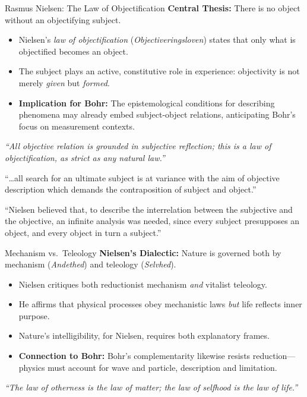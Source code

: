 \documentclass[fleqn]{beamer}
\begin{document}
\begin{frame}{Rasmus Nielsen: The Law of Objectification}
  \textbf{Central Thesis:} There is no object without an objectifying subject.

  \vspace{1em}
  \begin{itemize}
    \item Nielsen’s \emph{law of objectification} (\textit{Objectiveringsloven}) states that 
    only what is objectified becomes an object.
    \item The subject plays an active, constitutive role in experience: objectivity is not merely \emph{given} but \emph{formed}.
    \item \textbf{Implication for Bohr:} The epistemological conditions for describing phenomena 
    may already embed subject-object relations, anticipating Bohr’s focus on measurement contexts.
  \end{itemize}

  \vspace{1em}
  \textit{“All objective relation is grounded in subjective reflection; this is a law of objectification, as strict as any natural law.”}
\end{frame}

\begin{frame}{\mbox{}}

  ``\dots all search for an ultimate subject is at variance with the
  aim of objective description which demands the contraposition of
  subject and object.''  \citep[]{unity}

  \vfill ``Nielsen believed that, to describe the interrelation
  between the subjective and the objective, an infinite analysis was
  needed, since every subject presupposes an object, and every object
  in turn a subject.''  \citep[189]{hoffding1909}

  \nocite{prop60}

\end{frame}


\begin{frame}{Mechanism vs.\ Teleology}
  \textbf{Nielsen's Dialectic:} Nature is governed both by mechanism (\textit{Andethed}) and teleology (\textit{Selvhed}).

  \vspace{1em}
  \begin{itemize}
    \item Nielsen critiques both reductionist mechanism \textit{and} vitalist teleology.
    \item He affirms that physical processes obey mechanistic laws \textit{but} life reflects inner purpose.
    \item Nature’s intelligibility, for Nielsen, requires both explanatory frames.
    \item \textbf{Connection to Bohr:} Bohr's complementarity likewise resists reduction---physics must account for wave and particle, description and limitation.
  \end{itemize}

  \vspace{1em}
  \textit{``The law of otherness is the law of matter; the law of selfhood is the law of life.''}
\end{frame}
\end{document}
